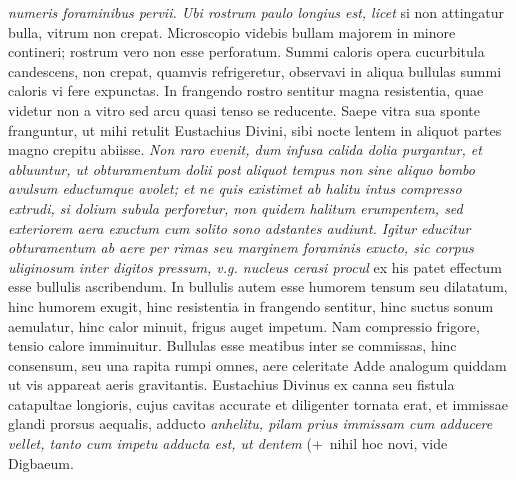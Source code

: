 \noindent{}
\pend
\newpage
\pstart \noindent \textit{numeris foraminibus pervii.
Ubi rostrum paulo longius est, licet
}
si non attingatur bulla, vitrum non crepat.
Microscopio videbis bullam majorem in minore contineri; rostrum vero non esse perforatum. Summi caloris opera\protect{} cucurbitula candescens, non crepat, quamvis refrigeretur, observavi in aliqua bullulas summi caloris vi fere expunctas. In frangendo rostro sentitur magna resistentia, quae videtur non a vitro sed arcu quasi tenso se reducente. Saepe vitra sua sponte franguntur, ut mihi retulit Eustachius
Divini\protect{}, sibi nocte lentem in aliquot partes magno crepitu abiisse. \textit{Non raro evenit, dum infusa calida dolia purgantur, et abluuntur, ut obturamentum dolii post aliquot tempus non sine aliquo bombo avulsum eductumque avolet; et ne quis existimet ab halitu intus compresso extrudi, si dolium\protect{} subula perforetur, non quidem halitum\protect{} erumpentem, sed exteriorem aera exuctum cum solito sono adstantes audiunt. Igitur educitur obturamentum ab aere per rimas\protect{} seu marginem foraminis exucto, sic corpus uliginosum inter digitos pressum, v.g. nucleus cerasi procul }  ex his patet effectum esse bullulis ascribendum. In bullulis\protect{} autem esse humorem tensum seu dilatatum, hinc humorem exugit, hinc resistentia in frangendo sentitur, hinc suctus sonum aemulatur, hinc calor\protect{} minuit, frigus\protect{} auget impetum. Nam compressio frigore, tensio calore imminuitur. Bullulas esse meatibus inter se commissas, hinc consensum, seu una rapita rumpi omnes, aere celeritate 
\pend 
\pstart Adde analogum quiddam ut vis appareat aeris
gravitantis. Eustachius Divinus\protect{} ex canna seu fistula catapultae longioris, cujus cavitas accurate et diligenter tornata erat, et immissae glandi prorsus aequalis, adducto \textit{anhelitu, pilam prius immissam cum adducere vellet, tanto cum impetu adducta est, ut dentem } (+~nihil hoc novi, vide Digbaeum\protect{}.
